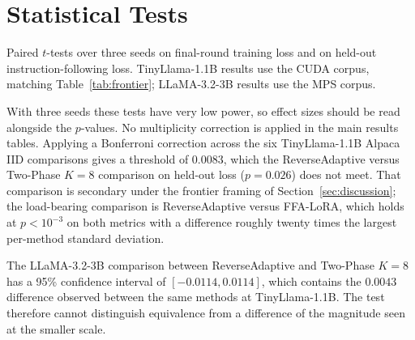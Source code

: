 \section{Statistical Tests}
\label{app:stats}
Paired $t$-tests over three seeds on final-round training loss and on held-out instruction-following loss. TinyLlama-1.1B results use the CUDA corpus, matching Table~\ref{tab:frontier}; LLaMA-3.2-3B results use the MPS corpus.

With three seeds these tests have very low power, so effect sizes should be read alongside the $p$-values. No multiplicity correction is applied in the main results tables. Applying a Bonferroni correction across the six TinyLlama-1.1B Alpaca IID comparisons gives a threshold of $0.0083$, which the ReverseAdaptive versus Two-Phase $K{=}8$ comparison on held-out loss ($p = 0.026$) does not meet. That comparison is secondary under the frontier framing of Section~\ref{sec:discussion}; the load-bearing comparison is ReverseAdaptive versus FFA-LoRA, which holds at $p < 10^{-3}$ on both metrics with a difference roughly twenty times the largest per-method standard deviation.

The LLaMA-3.2-3B comparison between ReverseAdaptive and Two-Phase $K{=}8$ has a 95\% confidence interval of $[-0.0114, 0.0114]$, which contains the $0.0043$ difference observed between the same methods at TinyLlama-1.1B. The test therefore cannot distinguish equivalence from a difference of the magnitude seen at the smaller scale.

